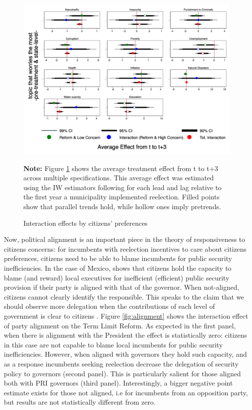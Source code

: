 \documentclass[12pt]{amsart}
\numberwithin{equation}{section}
\theoremstyle{definition}
\theoremstyle{definition}
\theoremstyle{definition}
\begin{document}
\begin{figure}[H]   
\centering
 \caption{Interaction effects by citizens' preferences}
 \label{fig:preferences_all}
\includegraphics[width=1\textwidth]{Figures/preferences.png}
       \captionsetup{justification=centering}
       
 \textbf{Note:} Figure \ref{fig:preferences_all} shows the average treatment effect from t to t+3 across multiple specifications. This average effect was estimated using the IW estimators following \citet{abraham_sun_2020} for each lead and lag relative to the first year a municipality implemented reelection. Filled points show that parallel trends hold, while hollow ones imply pretrends.  
\end{figure} 
  
Now, political alignment is an important piece in the theory of responsiveness to citizens concerns: for incumbents with reelection incentives to care about citizens preferences, citizens need to be able to blame incumbents for public security inefficiencies. In the case of Mexico, \citet{ley_2017} shows that citizens hold the capacity to blame (and reward) local executives for inefficient (efficient) public security provision if their party is aligned with that of the governor. When not-aligned, citizens cannot clearly identify the responsible. This speaks to the claim that we should observe more delegation when the contributions of each level of government is clear to citizens \citep{treisman_2000}. Figure \ref{fig:alignment} shows the interaction effect of party alignment on the Term Limit Reform. As expected in the first panel, when there is alignment with the President the effect is statistically zero: citizens in this case are not capable to blame local incumbents for public security inefficiencies. However, when aligned with governors they hold such capacity, and as a response incumbents seeking reelection decrease the delegation of security policy to governors (second panel). This is particularly salient for those aligned both with PRI governors (third panel). Interestingly, a bigger negative point estimate exists for those not aligned, i.e for incumbents from an opposition party, but results are not statistically different from zero. 
\end{document}
